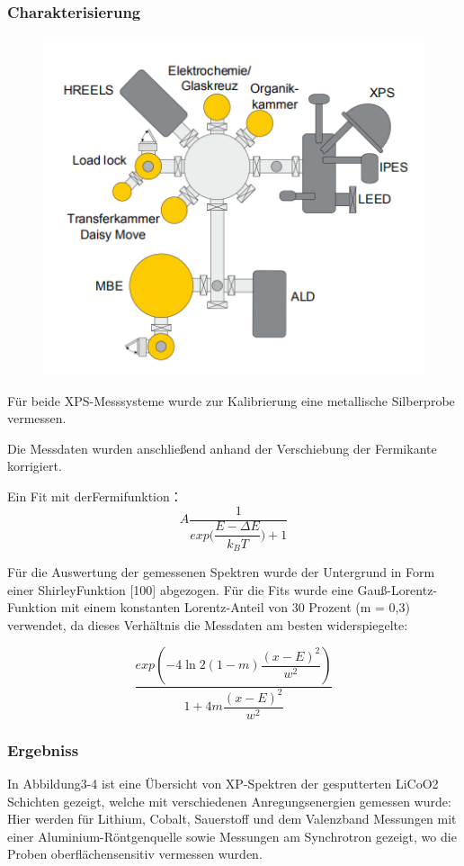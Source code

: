 \documentclass[12pt,UTF8]{article}
\begin{document}
\subsubsection{Charakterisierung}
\begin{figure}[H]
    \centering
    \includegraphics[width=.5\linewidth]{Diagramme/fig3_1_3.png}
    \caption{}
\end{figure}

Für beide XPS-Messsysteme wurde zur Kalibrierung eine metallische Silberprobe vermessen.

Die Messdaten wurden anschließend anhand der Verschiebung der Fermikante korrigiert.

Ein Fit mit derFermifunktion：
\begin{equation}
    A\dfrac{1}{exp({\dfrac{E-\Delta E}{k_B T})+1}}
\end{equation}

Für die Auswertung der gemessenen Spektren wurde der Untergrund in Form einer ShirleyFunktion [100] abgezogen. Für die Fits wurde eine Gauß-Lorentz-Funktion mit einem
konstanten Lorentz-Anteil von 30 Prozent (m = 0,3) verwendet, da dieses Verhältnis die
Messdaten am besten widerspiegelte:

\begin{equation}
    \dfrac{exp\left(-4\ln2(1-m)\dfrac{(x-E)^2}{w^2}\right)}{1+4m\dfrac{(x-E)^2}{w^2}}
\end{equation}

\subsubsection{Ergebniss}
In Abbildung3-4 ist eine Übersicht von XP-Spektren der gesputterten LiCoO2 Schichten
gezeigt, welche mit verschiedenen Anregungsenergien gemessen wurde: Hier werden für
Lithium, Cobalt, Sauerstoff und dem Valenzband Messungen mit einer Aluminium-Röntgenquelle sowie Messungen am Synchrotron gezeigt, wo die Proben oberflächensensitiv vermessen wurden.
\end{document}
